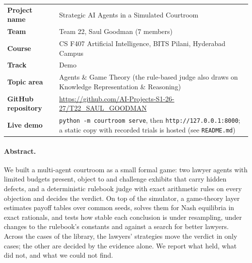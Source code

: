 \documentclass[11pt,a4paper]{article}
\newcommand{\file}[1]{\texttt{#1}}
\begin{document}
\begin{tabularx}{\textwidth}{@{}lX@{}}
\textbf{Project name} & Strategic AI Agents in a Simulated Courtroom\\
\textbf{Team} & Team 22, Saul Goodman (7 members)\\
\textbf{Course} & CS F407 Artificial Intelligence, BITS Pilani, Hyderabad Campus\\
\textbf{Track} & Demo\\
\textbf{Topic area} & Agents \& Game Theory (the rule-based judge also draws on Knowledge Representation \& Reasoning)\\
\textbf{GitHub repository} & \url{https://github.com/AI-Projects-S1-26-27/T22_SAUL_GOODMAN}\\
\textbf{Live demo} & \texttt{python -m courtroom serve}, then \texttt{http://127.0.0.1:8000}; a static copy with recorded trials is hosted (see \file{README.md})\\
\end{tabularx}

\paragraph{Abstract.} We built a multi-agent courtroom as a small formal game: two lawyer agents with limited budgets present, object to and challenge exhibits that carry hidden defects, and a deterministic rulebook judge with exact arithmetic rules on every objection and decides the verdict. On top of the simulator, a game-theory layer estimates payoff tables over \BootSeeds{} common seeds, solves them for Nash equilibria in exact rationals, and tests how stable each conclusion is under resampling, under changes to the rulebook's constants and against a search for better lawyers. Across the \NCases{} cases of the library, the lawyers' strategies move the verdict in only \NMove{} cases; the other \NEvidence{} are decided by the evidence alone. We report what held, what did not, and what we could not find.

\tableofcontents
\newpage










\end{document}
